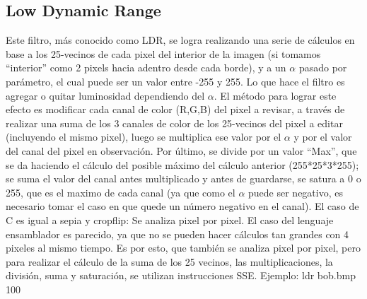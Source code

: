 \documentclass[a4paper]{article}
\begin{document}
\subsection{Low Dynamic Range}
Este filtro, más conocido como LDR, se logra realizando una serie de cálculos en base a los 25-vecinos de cada pixel del interior
de la imagen (si tomamos ``interior'' como 2 pixels hacia adentro desde cada borde), y a un $\alpha$ pasado por parámetro, el cual puede ser
un valor entre -255 y 255. Lo que hace el filtro es agregar o quitar luminosidad dependiendo del $\alpha$. El método para lograr este efecto es
modificar cada canal de color (R,G,B) del pixel a revisar, a través de realizar una suma de los 3 canales de color de los 25-vecinos del pixel a editar (incluyendo el mismo pixel),
luego se multiplica ese valor por el $\alpha$ y por el valor del canal del pixel en observación. Por último, se divide por un valor ``Max'',
que se da haciendo el cálculo del posible máximo del cálculo anterior (255*25*3*255); se suma el valor del canal antes multiplicado y antes
de guardarse, se satura a 0 o 255, que es el maximo de cada canal (ya que como el $\alpha$ puede ser negativo, es necesario tomar el caso
en que quede un número negativo en el canal).
\newline
El caso de C es igual a sepia y cropflip: Se analiza pixel por pixel. El caso del lenguaje ensamblador es parecido, ya que no se pueden
hacer cálculos tan grandes con 4 pixeles al mismo tiempo. Es por esto, que también se analiza pixel por pixel, pero para realizar el
cálculo de la suma de los 25 vecinos, las multiplicaciones, la división, suma y saturación, se utilizan instrucciones SSE.
\newline
Ejemplo: ldr bob.bmp 100
\end{document}
